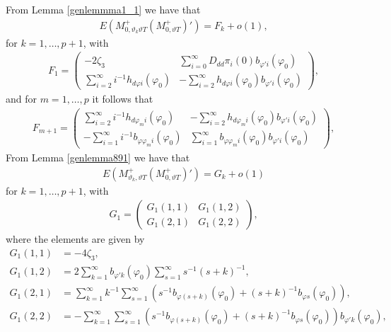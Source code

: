 {{From Lemma \ref{genlemmma1_1} we have that
\begin{align*}
     E\left(M_{0,\vartheta_k\vartheta T}^{+} \left(M^+_{0,\vartheta T}\right)'  \right) = F_{k} + o(1),  
\end{align*}
for $k = 1,\ldots,p+1$, with 
\begin{align}
    F_{1} = \begin{pmatrix}
-2 \zeta_3 &  \sum_{i = 0}^{\infty} D_{dd} \pi_i(0) b_{\varphi'i}(\varphi_0)  \\
 \sum_{i = 2}^{\infty} i^{-1} h_{d \varphi i}(\varphi_0)  &-    \sum_{i = 2}^{\infty}    h_{d \varphi i}(\varphi_0) b_{\varphi' i}(\varphi_0) 
\end{pmatrix},  \label{genF1}
\end{align}
and for $m = 1,\dots, p$ it follows that
\begin{align}
    F_{m+1} = \begin{pmatrix}
  \sum_{i = 2}^{\infty} i^{-1} h_{d \varphi_m i}(\varphi_0)    & - \sum_{i = 2}^{\infty}    h_{d \varphi_{m} i}(\varphi_0) b_{\varphi' i}(\varphi_0)  \\
 -\sum_{i = 1}^{\infty} i^{-1} b_{\varphi \varphi_m i}(\varphi_0)  & \sum_{i = 1}^{\infty}  b_{\varphi \varphi_m i}(\varphi_0) b_{\varphi' i}(\varphi_0) 
\end{pmatrix},  \label{genF2}
\end{align}
From Lemma \ref{genlemma891} we have that
\begin{align*}
     E\left(M_{\vartheta_k,\vartheta T}^{+} \left(M^+_{0,\vartheta T}\right)'  \right)  = G_{k} + o(1)  
\end{align*}
for $k = 1,\ldots,p+1$, with
\begin{align}
   G_{1} = \begin{pmatrix}
G_{1}(1,1) &  G_{1}(1,2) \\
G_{1}(2,1) & G_{1}(2,2) 
\end{pmatrix},  \label{genG1}
\end{align}
where the elements are given by
\begin{align*}
G_{1}(1,1) &=  -4 \zeta_3, \\
G_{1}(1,2) &=  2 \sum^{\infty}_{k = 1} b_{\varphi' k}(\varphi_0) \sum_{s = 1}^{\infty} s^{-1} (s+k)^{-1}, \\
G_{1}(2,1) &=  \sum_{k = 1}^{\infty} k^{-1} \sum_{s = 1}^{\infty} \left(  s^{-1} b_{\varphi (s+k)}(\varphi_0) + (s+k)^{-1} b_{\varphi s}(\varphi_0) \right), \\
G_{1}(2,2) &= -\sum_{k = 1}^{\infty} \sum_{s = 1}^{\infty} \left(  s^{-1} b_{\varphi (s+k)}(\varphi_0) + (s+k)^{-1} b_{\varphi s}(\varphi_0) \right)  b_{\varphi' k}(\varphi_0),

\end{align*}}}
